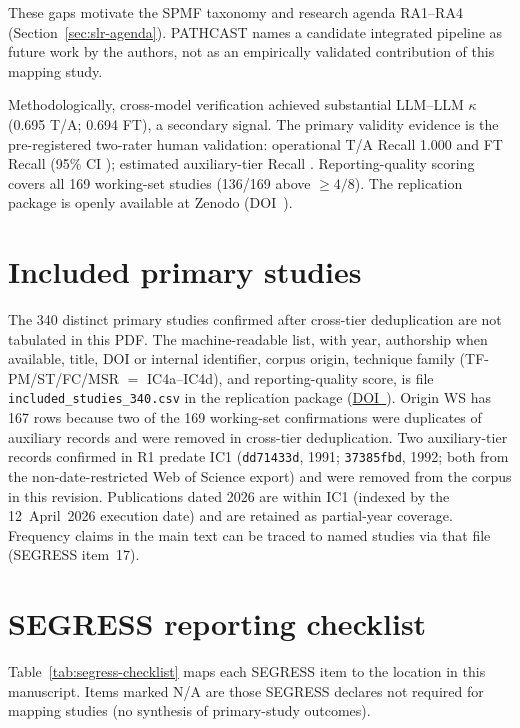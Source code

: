 These gaps motivate the SPMF taxonomy and research agenda RA1--RA4
(Section~\ref{sec:slr-agenda}). PATHCAST names a candidate integrated
pipeline as future work by the authors, not as an empirically validated
contribution of this mapping study.

Methodologically, cross-model verification achieved substantial LLM--LLM
$\kappa$ (0.695 T/A; 0.694 FT), a secondary signal. The primary validity
evidence is the pre-registered two-rater human validation: operational T/A
Recall 1.000 and FT Recall  (95\% CI ); estimated
auxiliary-tier Recall . Reporting-quality scoring
covers all 169 working-set studies (136/169 above $\geq 4/8$). The replication
package is openly available at Zenodo (DOI~\zenododoi).

\appendix
\section{Included primary studies}
\label{app:included}

The 340 distinct primary studies confirmed after cross-tier deduplication
are not tabulated in this PDF. The machine-readable list, with year,
authorship when available, title, DOI or internal identifier, corpus origin,
technique family (TF-PM/ST/FC/MSR $=$ IC4a--IC4d), and reporting-quality
score, is file \texttt{included\_studies\_340.csv} in the replication package
(\href{\zenododoiurl}{DOI~\zenododoi}).
Origin WS has 167 rows because two of the 169 working-set confirmations
were duplicates of auxiliary records and were removed in cross-tier
deduplication. Two auxiliary-tier records confirmed in R1 predate IC1
(\texttt{dd71433d}, 1991; \texttt{37385fbd}, 1992; both from the
non-date-restricted Web of Science export) and were removed from the corpus
in this revision. Publications dated 2026 are within IC1 (indexed by the
12~April~2026 execution date) and are retained as partial-year coverage.
Frequency claims in the main text can be traced to named studies via that
file (SEGRESS item~17).

\section{SEGRESS reporting checklist}
\label{app:segress}

Table~\ref{tab:segress-checklist} maps each SEGRESS item to the location in
this manuscript. Items marked N/A are those SEGRESS declares not required
for mapping studies (no synthesis of primary-study outcomes).


